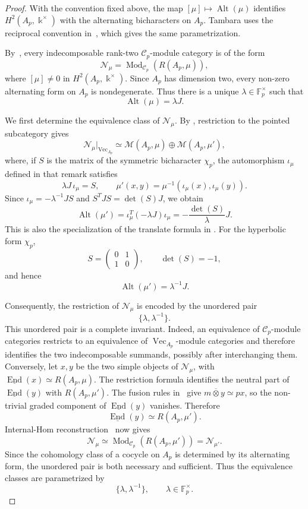 \documentclass[12pt]{amsart}
\theoremstyle{plain}
\theoremstyle{definition} %
\theoremstyle{remark} %
\newcommand{\ku}{{\Bbbk}} %
\DeclareMathOperator{\VecCat}{Vec}
\newcommand{\ModCat}{\mathcal{M}}
\newcommand{\Vect}[1]{\VecCat_{#1}}
\newcommand{\cC}{\mathcal{C}}
\newcommand{\cN}{\mathcal{N}}
\newcommand{\Mod}{\operatorname{Mod}}
\newcommand{\Alt}{\operatorname{Alt}}
\begin{document}
\begin{proof}
With the convention fixed above, the map
\([\mu]\mapsto\Alt(\mu)\) identifies
\(H^2(A_p,\ku^\times)\) with the alternating bicharacters on \(A_p\).
Tambara uses the reciprocal convention in~\cite[Proposition~2.6]{T00},
which gives the same parametrization.

By~\cite[Lemma~4.3]{Nik08}, every indecomposable rank-two
\(\cC_p\)-module category is of the form
\[
\cN_\mu=\Mod_{\cC_p}(R(A_p,\mu)),
\]
where \([\mu]\ne0\) in \(H^2(A_p,\ku^\times)\). Since \(A_p\) has
dimension two, every non-zero alternating form on \(A_p\) is
nondegenerate. Thus there is a unique \(\lambda\in\mathbb F_p^\times\)
such that
\[
\Alt(\mu)=\lambda J.
\]

We first determine the equivalence class of \(\cN_\mu\). By
\cite[Remark~4.5]{Nik08}, restriction to the pointed subcategory gives
\[
\cN_\mu|_{\Vect{A_p}}
\simeq
\ModCat(A_p,\mu)\oplus\ModCat(A_p,\mu'),
\]
where, if \(S\) is the matrix of the symmetric bicharacter \(\chi_p\), the
automorphism \(\iota_\mu\) defined in that remark satisfies
\[
\lambda J\,\iota_\mu=S,
\qquad
\mu'(x,y)=\mu^{-1}(\iota_\mu(x),\iota_\mu(y)).
\]
Since \(\iota_\mu=-\lambda^{-1}JS\) and
\(S^TJS=\det(S)J\), we obtain
\[
\Alt(\mu')
=\iota_\mu^T(-\lambda J)\iota_\mu
=-\frac{\det(S)}{\lambda}J.
\]
This is also the specialization of the translate formula in
\cite[Lemma~9.1]{MeMu12}. For the hyperbolic form \(\chi_p\),
\[
S=\begin{pmatrix}0&1\\1&0\end{pmatrix},
\qquad \det(S)=-1,
\]
and hence
\[
\Alt(\mu')=\lambda^{-1}J.
\]

Consequently, the restriction of \(\cN_\mu\) is encoded by the unordered
pair
\[
\{\lambda,\lambda^{-1}\}.
\]
This unordered pair is a complete invariant. Indeed, an equivalence of
\(\cC_p\)-module categories restricts to an equivalence of
\(\Vect{A_p}\)-module categories and therefore identifies the two
indecomposable summands, possibly after interchanging them. Conversely,
let \(x,y\) be the two simple objects of \(\cN_\mu\), with
\(\underline{\operatorname{End}}(x)\simeq R(A_p,\mu)\). The restriction
formula identifies the neutral part of
\(\underline{\operatorname{End}}(y)\) with \(R(A_p,\mu')\). The fusion
rules in~\cite[Lemma~4.3]{Nik08} give
\(m\overline\otimes y\simeq p x\), so the non-trivial graded component of
\(\underline{\operatorname{End}}(y)\) vanishes. Therefore
\[
\underline{\operatorname{End}}(y)\simeq R(A_p,\mu').
\]
Internal-Hom reconstruction~\cite[Section~2.1]{Nik08} now gives
\[
\cN_\mu
\simeq
\Mod_{\cC_p}(R(A_p,\mu'))
=\cN_{\mu'}.
\]
Since the cohomology class of a cocycle on \(A_p\) is determined by its
alternating form, the unordered pair is both necessary and sufficient.
Thus the equivalence classes are parametrized by
\[
\{\lambda,\lambda^{-1}\},
\qquad \lambda\in\mathbb F_p^\times.
\]


\end{proof}
\end{document}
